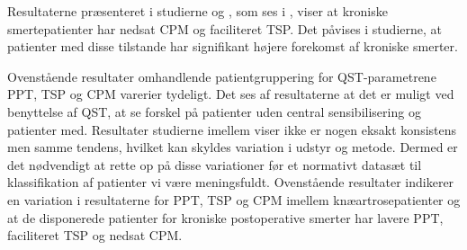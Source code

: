 Resultaterne præsenteret i studierne  og , som ses i , viser at kroniske smertepatienter har nedsat CPM og faciliteret TSP. Det påvises i studierne, at patienter med disse tilstande har signifikant højere forekomst af kroniske smerter. \citep{Vaegter2016} \citep{Petersen2016}


Ovenstående resultater omhandlende patientgruppering for QST-parametrene PPT, TSP og
CPM varerier tydeligt. Det ses af resultaterne at det er muligt ved benyttelse af QST, at se
forskel på patienter uden central sensibilisering og patienter med. Resultater studierne imellem viser ikke er nogen eksakt konsistens men samme tendens, hvilket kan skyldes variation i udstyr og metode. Dermed er det nødvendigt at rette op på disse variationer før et normativt datasæt til klassifikation af patienter vi være meningsfuldt. Ovenstående resultater indikerer en variation i resultaterne for PPT, TSP og CPM imellem knæartrosepatienter og at de disponerede patienter for kroniske postoperative smerter har lavere PPT, faciliteret TSP og nedsat CPM.

